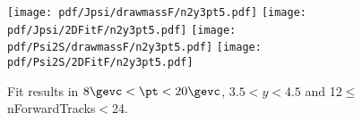 \begin{figure}[H]
\begin{center}
\texttt{[image: pdf/Jpsi/drawmassF/n2y3pt5.pdf]}
\texttt{[image: pdf/Jpsi/2DFitF/n2y3pt5.pdf]}
\vspace*{-0.5cm}
\texttt{[image: pdf/Psi2S/drawmassF/n2y3pt5.pdf]}
\texttt{[image: pdf/Psi2S/2DFitF/n2y3pt5.pdf]}
\vspace*{-0.5cm}
\end{center}
\caption{Fit results in $8\gevc<\pt<20\gevc$, $3.5<y<4.5$ and 12$\leq$nForwardTracks$<$24.}
\label{Fitn2y3pt5}
\end{figure}
